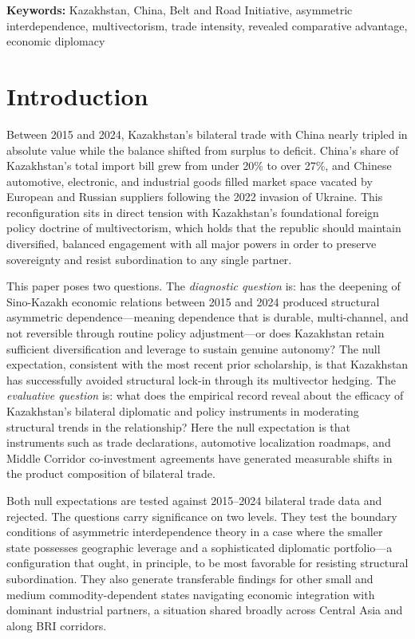 \documentclass[12pt]{article}
\begin{document}
\bigskip
\noindent\textbf{Keywords:} Kazakhstan, China, Belt and Road Initiative, asymmetric interdependence, multivectorism, trade intensity, revealed comparative advantage, economic diplomacy

\section{Introduction}

Between 2015 and 2024, Kazakhstan's bilateral trade with China nearly tripled in absolute value while the balance shifted from surplus to deficit. China's share of Kazakhstan's total import bill grew from under 20\% to over 27\%, and Chinese automotive, electronic, and industrial goods filled market space vacated by European and Russian suppliers following the 2022 invasion of Ukraine. This reconfiguration sits in direct tension with Kazakhstan's foundational foreign policy doctrine of multivectorism, which holds that the republic should maintain diversified, balanced engagement with all major powers in order to preserve sovereignty and resist subordination to any single partner.

This paper poses two questions. The \textit{diagnostic question} is: has the deepening of Sino-Kazakh economic relations between 2015 and 2024 produced structural asymmetric dependence---meaning dependence that is durable, multi-channel, and not reversible through routine policy adjustment---or does Kazakhstan retain sufficient diversification and leverage to sustain genuine autonomy? The null expectation, consistent with the most recent prior scholarship, is that Kazakhstan has successfully avoided structural lock-in through its multivector hedging. The \textit{evaluative question} is: what does the empirical record reveal about the efficacy of Kazakhstan's bilateral diplomatic and policy instruments in moderating structural trends in the relationship? Here the null expectation is that instruments such as trade declarations, automotive localization roadmaps, and Middle Corridor co-investment agreements have generated measurable shifts in the product composition of bilateral trade.

Both null expectations are tested against 2015--2024 bilateral trade data and rejected. The questions carry significance on two levels. They test the boundary conditions of asymmetric interdependence theory in a case where the smaller state possesses geographic leverage and a sophisticated diplomatic portfolio---a configuration that ought, in principle, to be most favorable for resisting structural subordination. They also generate transferable findings for other small and medium commodity-dependent states navigating economic integration with dominant industrial partners, a situation shared broadly across Central Asia and along BRI corridors.
\end{document}
